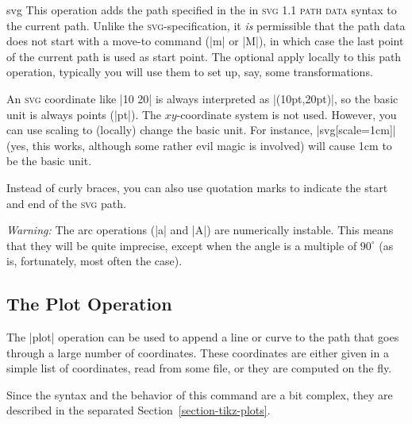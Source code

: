 \begin{pathoperation}{svg}{}
    This operation adds the path specified in the  in
    \textsc{svg 1.1 path data} syntax to the current path. Unlike the
    \textsc{svg}-specification, it \emph{is} permissible that the path data
    does not start with a move-to command (|m| or |M|), in which case the last
    point of the current path is used as start point. The optional
     apply locally to this path operation, typically you will use
    them to set up, say, some transformations.
\begin{codeexample}[preamble={\usetikzlibrary{svg.path}}]
\end{codeexample}

    An \textsc{svg} coordinate like |10 20| is always interpreted as
    |(10pt,20pt)|, so the basic unit is always points (|pt|). The
    $xy$-coordinate system is not used. However, you can use scaling to
    (locally) change the basic unit. For instance, |svg[scale=1cm]| (yes, this
    works, although some rather evil magic is involved) will cause 1cm to be
    the basic unit.

    Instead of curly braces, you can also use quotation marks to indicate the
    start and end of the \textsc{svg} path.

    \emph{Warning:} The arc operations (|a| and |A|) are  numerically instable.
    This means that they will be quite imprecise, except when the angle is a
    multiple of $90^\circ$ (as is, fortunately, most often the case).
\end{pathoperation}


\subsection{The Plot Operation}

The |plot| operation can be used to append a line or curve to the path that
goes through a large number of coordinates. These coordinates are either given
in a simple list of coordinates, read from some file, or they are computed on
the fly.

Since the syntax and the behavior of this command are a bit complex, they are
described in the separated Section~\ref{section-tikz-plots}.


